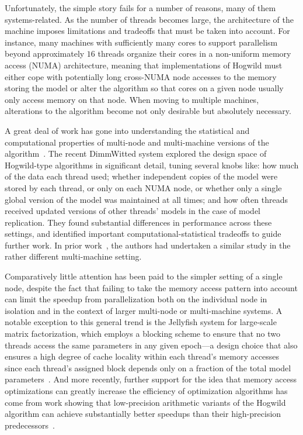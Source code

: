 \documentclass[times,11pt]{article}
\numberwithin{equation}{section}		%
\numberwithin{figure}{section}			%
\numberwithin{table}{section}				%
\begin{document}
Unfortunately, the simple story fails for a number of reasons, many of them systems-related. As the number of threads becomes large, the architecture of the machine
imposes limitations and tradeoffs that must be taken into account. For instance, many machines with sufficiently many cores to support parallelism beyond approximately $16$
threads organize their cores in a non-uniform memory access (NUMA) architecture, meaning that implementations of Hogwild must either cope with potentially long cross-NUMA node
accesses to the memory storing the model or alter the algorithm so that cores on a given node usually only access memory on that node. When moving to multiple machines,
alterations to the algorithm become not only desirable but absolutely necessary.

A great deal of work has gone into understanding the statistical and computational properties of multi-node and multi-machine versions of the algorithm~\cite{zhang2014dimmwitted, dean2012large}. The recent DimmWitted system
explored the design space of Hogwild-type algorithms in significant detail, tuning several knobs like: how much of the data each thread used; whether independent copies of the model were stored by each thread,
or only on each NUMA node, or whether only a single global version of the model was maintained at all times; and how often threads received updated versions of other threads' models in the case of model replication. They
found substantial differences in performance across these settings, and identified important computational-statistical tradeoffs to guide further work. In prior work~\cite{dean2012large}, the authors had undertaken a similar study in the rather different multi-machine setting.

Comparatively little attention has been paid to the simpler setting of a single node, despite the fact that failing to take the memory access pattern into account can limit the speedup from parallelization
both on the individual node in isolation and in the context of larger multi-node or multi-machine systems. A notable exception to this general trend is the Jellyfish system for large-scale matrix factorization, which employs a 
blocking scheme to ensure that no two threads access the same parameters in any given epoch---a design choice that also ensures a high degree of cache locality within each thread's memory accesses since each thread's 
assigned block depends only on a fraction of the total model parameters~\cite{recht2013parallel}. And more recently, further support for the idea that memory access optimizations can greatly increase the efficiency of optimization algorithms
has come from work showing that low-precision arithmetic variants of the Hogwild algorithm can achieve substantially better speedups than their high-precision predecessors~\cite{de2015taming}.
\end{document}
